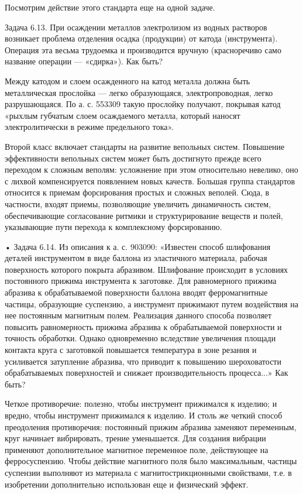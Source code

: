 Посмотрим действие этого стандарта еще на одной задаче.

Задача   6.13.  При   осаждении   металлов   электролизом  из   водных
растворов возникает  проблема отделения  осадка (продукции)  от катода
(инструмента). Операция  эта весьма  трудоемка и  производится вручную
(красноречиво само название операции — «сдирка»). Как быть?

Между  катодом  и  слоем  осажденного на  катод  металла  должна  быть
металлическая прослойка —  легко образующаяся, электропроводная, легко
разрушающаяся.  По а.  с.  553309 такую  прослойку получают,  покрывая
катод  «рыхлым губчатым  слоем  осаждаемого  металла, который  наносят
электролитически в режиме предельного тока».


Второй  класс   включает  стандарты  на  развитие   вепольных  систем.
Повышение эффективности вепольных систем  может быть достигнуто прежде
всего переходом  к сложным  веполям: усложнение при  этом относительно
невелико,  оно  с  лихвой  компенсируется  появлением  новых  качеств.
Большая  группа стандартов  относится к  приемам форсирования  простых
и  сложных  веполей. Сюда,  в  частности,  входят приемы,  позволяющие
увеличить  динамичность  систем, обеспечивающие  согласование  ритмики
и  структурирование  веществ  и  полей, указывающие  пути  перехода  к
комплексному форсированию.

• Задача 6.14. Из описания к а. с. 903090: «Известен способ шлифования
деталей инструментом в виде  баллона из эластичного материала, рабочая
поверхность  которого  покрыта   абразивом.  Шлифование  происходит  в
условиях постоянного прижима инструмента к заготовке. Для равномерного
прижима   абразива  к   обрабатываемой   поверхности  баллона   вводят
ферромагнитные частицы,  образующие суспензию, а  инструмент прижимают
путем  воздействия  на  нее  постоянным  магнитным  полем.  Реализация
данного способа  позволяет повысить  равномерность прижима  абразива к
обрабатываемой поверхности  и точность обработки.  Однако одновременно
вследствие увеличения  площади контакта круга с  заготовкой повышается
температура  в зоне  резания  и усиливается  затупление абразива,  что
приводит  к  повышению  шероховатости  обрабатываемых  поверхностей  и
снижает производительность процесса...» Как быть?

Четкое противоречие:  полезно, чтобы инструмент прижимался  к изделию;
и  вредно,  чтобы   инструмент  прижимался  к  изделию.   И  столь  же
четкий  способ преодоления  противоречия:  постоянный прижим  абразива
заменяют  переменным, круг  начинает вибрировать,  трение уменьшается.
Для  создания вибрации  применяют дополнительное  магнитное переменное
поле, действующее  на ферросуспензию.  Чтобы действие  магнитного поля
было  максимальным,   частицы  суспензии  выполняют  из   материала  с
магнитострикционными  свойствами,  т.е.  в  изобретении  дополнительно
использован еще и физический эффект.

